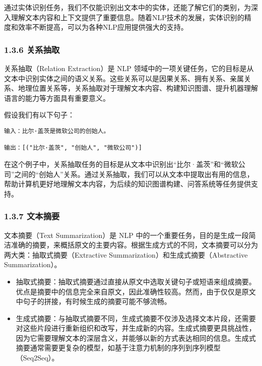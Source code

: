 \documentclass[
]{article}
\providecommand{\tightlist}{%
  \setlength{\itemsep}{0pt}\setlength{\parskip}{0pt}}
\begin{document}
通过实体识别任务，我们不仅能识别出文本中的实体，还能了解它们的类别，为深入理解文本内容和上下文提供了重要信息。随着NLP技术的发展，实体识别的精度和效率不断提高，可以为各种NLP应用提供强大的支持。

\subsubsection{1.3.6 关系抽取}\label{ux5173ux7cfbux62bdux53d6}

关系抽取（Relation Extraction）是 NLP
领域中的一项关键任务，它的目标是从文本中识别实体之间的语义关系。这些关系可以是因果关系、拥有关系、亲属关系、地理位置关系等，关系抽取对于理解文本内容、构建知识图谱、提升机器理解语言的能力等方面具有重要意义。

假设我们有以下句子：

\begin{verbatim}
输入：比尔·盖茨是微软公司的创始人。

输出：[("比尔·盖茨", "创始人", "微软公司")]
\end{verbatim}

在这个例子中，关系抽取任务的目标是从文本中识别出``比尔·盖茨''和``微软公司''之间的``创始人''关系。通过关系抽取，我们可以从文本中提取出有用的信息，帮助计算机更好地理解文本内容，为后续的知识图谱构建、问答系统等任务提供支持。

\subsubsection{1.3.7 文本摘要}\label{ux6587ux672cux6458ux8981}

文本摘要（Text Summarization）是 NLP
中的一个重要任务，目的是生成一段简洁准确的摘要，来概括原文的主要内容。根据生成方式的不同，文本摘要可以分为两大类：抽取式摘要（Extractive
Summarization）和生成式摘要（Abstractive Summarization）。

\begin{itemize}
\tightlist
\item
  抽取式摘要：抽取式摘要通过直接从原文中选取关键句子或短语来组成摘要。优点是摘要中的信息完全来自原文，因此准确性较高。然而，由于仅仅是原文中句子的拼接，有时候生成的摘要可能不够流畅。
\item
  生成式摘要：与抽取式摘要不同，生成式摘要不仅涉及选择文本片段，还需要对这些片段进行重新组织和改写，并生成新的内容。生成式摘要更具挑战性，因为它需要理解文本的深层含义，并能够以新的方式表达相同的信息。生成式摘要通常需要更复杂的模型，如基于注意力机制的序列到序列模型（Seq2Seq）。
\end{itemize}
\end{document}
